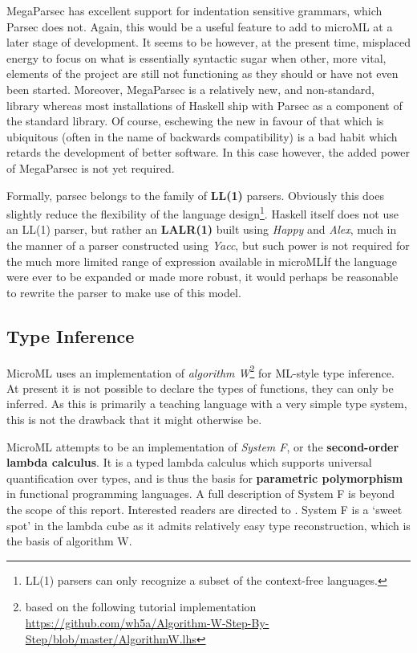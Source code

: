 \documentclass[12pt, a4paper]{report}
\begin{document}
MegaParsec has excellent
support for indentation sensitive grammars, which Parsec does not. Again, this would be a useful
feature to add to microML at a later stage of development. It seems to be however, at the present time, misplaced
energy to focus on what is essentially syntactic sugar when other, more vital, elements of the
project are still not functioning as they should or have not even been started. Moreover, MegaParsec
is a relatively new, and non-standard, library whereas most installations of Haskell ship with
Parsec as a component of the standard library. Of course, eschewing the new in favour of that which
is ubiquitous (often in the name of backwards compatibility) is a bad habit which retards the
development of better software. In this case however, the added power of MegaParsec is not yet
required.

Formally, parsec belongs to the family of \textbf{LL(1)} parsers. Obviously this does slightly reduce the
flexibility of the language design\footnote{LL(1) parsers can only recognize a subset of the
    context-free languages.}. Haskell itself does not use an LL(1) parser, but rather an
    \textbf{LALR(1)} built using \textit{Happy} and \textit{Alex}, much in the manner of a parser constructed using
\textit{Yacc}, but such power is not required for the much more limited range of expression
available in microML\. If the language were ever to be expanded or made more robust, it would perhaps
be reasonable to rewrite the parser to make use of this model.

\subsection{Type Inference}
\label{sec:type}
MicroML uses an implementation of
\textit{algorithm W}\footnote{based on the following tutorial implementation
    \url{https://github.com/wh5a/Algorithm-W-Step-By-Step/blob/master/AlgorithmW.lhs}} for ML-style type inference. At present it is
not possible to declare the types of functions, they can only be inferred. As this is primarily a
teaching language with a very simple type system, this is not the drawback that it might otherwise
be. 

MicroML attempts to be an implementation of \textit{System F}, or the \textbf{second-order lambda
calculus}. It is a typed lambda calculus which supports universal quantification over types, and is
thus the basis for \textbf{parametric polymorphism} in functional programming languages. A full
description of System F is beyond the scope of this report. Interested readers are directed to
\cite{Pierce}. System F is a `sweet spot' in the lambda cube as it admits relatively easy type
reconstruction, which is the basis of algorithm W.
\end{document}
